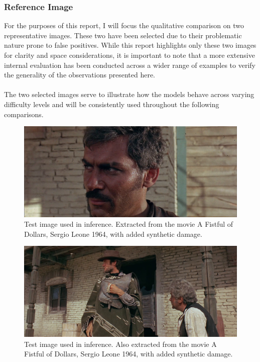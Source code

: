 \documentclass[openany, 12pt]{article}
\begin{document}
{\subsubsection*{Reference Image}
For the purposes of this report, I will focus the qualitative comparison on two representative images. These two have been selected due to their problematic nature prone to false positives. While this report highlights only these two images for clarity and space considerations, it is important to note that a more extensive internal evaluation has been conducted across a wider range of examples to verify the generality of the observations presented here.\\
\\
The two selected images serve to illustrate how the models behave across varying difficulty levels and will be consistently used throughout the following comparisons.
	\begin{figure}[h!]
	\centering
	\includegraphics[width=0.8\linewidth]{images/punado_dollars_frame_0084.png}
	\caption{\smaller Test image used in inference. Extracted from the movie A Fistful of Dollars, Sergio Leone 1964, with added synthetic damage.} 
\end{figure}
	\begin{figure}[h!]
	\centering
	\includegraphics[width=0.8\linewidth]{images/punado_dollars_frame_0122.png}
	\caption{\smaller Test image used in inference. Also extracted from the movie A Fistful of Dollars, Sergio Leone 1964, with added synthetic damage.} 
\end{figure}
\newpage
}
\end{document}
